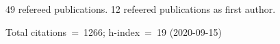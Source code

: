 49 refereed publications. 12 refeered publications as first author.

Total citations~=~1266; h-index~=~19 (2020-09-15)